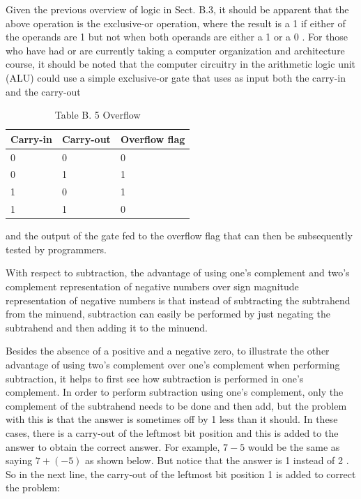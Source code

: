 \documentclass[10pt]{book}
\begin{document}
Given the previous overview of logic in Sect. B.3, it should be apparent that the above operation is the exclusive-or operation, where the result is a 1 if either of the operands are 1 but not when both operands are either a 1 or a 0 . For those who have had or are currently taking a computer organization and architecture course, it should be noted that the computer circuitry in the arithmetic logic unit (ALU) could use a simple exclusive-or gate that uses as input both the carry-in and the carry-out

\begin{table}[htbp]
\begin{center}
\captionsetup{labelformat=empty}
\caption{Table B. 5 Overflow}
\begin{tabular}{|l|l|l|}
\hline
Carry-in & Carry-out & Overflow flag \\
\hline
0 & 0 & 0 \\
\hline
0 & 1 & 1 \\
\hline
1 & 0 & 1 \\
\hline
1 & 1 & 0 \\
\hline
\end{tabular}
\end{center}
\end{table}

and the output of the gate fed to the overflow flag that can then be subsequently tested by programmers.

With respect to subtraction, the advantage of using one's complement and two's complement representation of negative numbers over sign magnitude representation of negative numbers is that instead of subtracting the subtrahend from the minuend, subtraction can easily be performed by just negating the subtrahend and then adding it to the minuend.

Besides the absence of a positive and a negative zero, to illustrate the other advantage of using two's complement over one's complement when performing subtraction, it helps to first see how subtraction is performed in one's complement. In order to perform subtraction using one's complement, only the complement of the subtrahend needs to be done and then add, but the problem with this is that the answer is sometimes off by 1 less than it should. In these cases, there is a carry-out of the leftmost bit position and this is added to the answer to obtain the correct answer. For example, $7-5$ would be the same as saying $7+(-5)$ as shown below. But notice that the answer is 1 instead of 2 . So in the next line, the carry-out of the leftmost bit position 1 is added to correct the problem:
\end{document}
